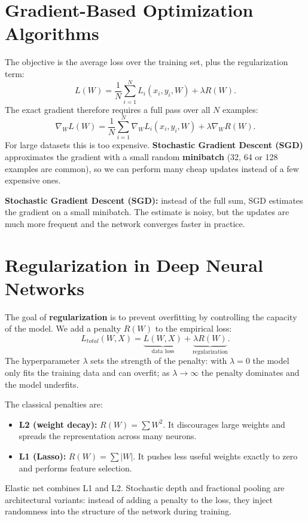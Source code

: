 \section{Gradient-Based Optimization Algorithms}

The objective is the average loss over the training set, plus the regularization term:
\[ L(W) = \frac{1}{N} \sum_{i=1}^N L_i(x_i, y_i, W) + \lambda R(W). \]
The exact gradient therefore requires a full pass over all $N$ examples:
\[ \nabla_W L(W) = \frac{1}{N} \sum_{i=1}^N \nabla_W L_i(x_i, y_i, W) + \lambda \nabla_W R(W). \]
For large datasets this is too expensive. \textbf{Stochastic Gradient Descent (SGD)} approximates the gradient with a small random \textbf{minibatch} (32, 64 or 128 examples are common), so we can perform many cheap updates instead of a few expensive ones.

\begin{keywordbox}
\textbf{Stochastic Gradient Descent (SGD):} instead of the full sum, SGD estimates the gradient on a small minibatch. The estimate is noisy, but the updates are much more frequent and the network converges faster in practice.
\end{keywordbox}

\section{Regularization in Deep Neural Networks}

The goal of \textbf{regularization} is to prevent overfitting by controlling the capacity of the model. We add a penalty $R(W)$ to the empirical loss:
\[ L_{total}(W, X) = \underbrace{L(W, X)}_{\text{data loss}} + \underbrace{\lambda R(W)}_{\text{regularization}}. \]
The hyperparameter $\lambda$ sets the strength of the penalty: with $\lambda=0$ the model only fits the training data and can overfit; as $\lambda \to \infty$ the penalty dominates and the model underfits.

The classical penalties are:
\begin{itemize}[nosep, leftmargin=*]
    \item \textbf{L2 (weight decay):} $R(W) = \sum W^2$. It discourages large weights and spreads the representation across many neurons.
    \item \textbf{L1 (Lasso):} $R(W) = \sum |W|$. It pushes less useful weights exactly to zero and performs feature selection.
\end{itemize}

Elastic net combines L1 and L2. Stochastic depth and fractional pooling are architectural variants: instead of adding a penalty to the loss, they inject randomness into the structure of the network during training.

